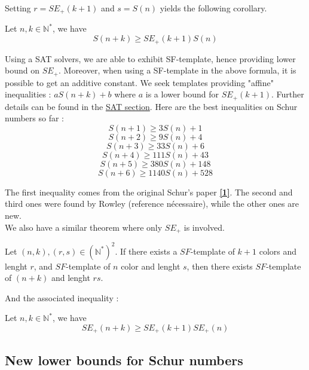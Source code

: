 Setting $r = SE_+(k+1)$ and $s = S(n)$ yields the following corollary. 

\begin{corollary}
	Let \(n, k \in \mathbb{N}^*\), we have \\
	\[ S(n+k) \geqslant SE_+(k+1)S(n) \]
\end{corollary}

Using a SAT solvers, we are able to exhibit SF-template,
hence providing lower bound on \(SE_+\). Moreover, when using 
a SF-template in the above formula, it is possible to get an additive constant. We seek templates providing "affine"
inequalities : \(aS(n+k) + b \) where \(a\) is a lower bound for \(SE_+(k+1)\). Further details can be found in the \hyperref[SAT]{SAT section}.
Here are the best inequalities on Schur numbers so far :
\[ S(n+1) \geqslant 3S(n) + 1 \]
\[ S(n+2) \geqslant 9S(n) + 4 \]
\[ S(n+3) \geqslant 33S(n) + 6 \]
\[ S(n+4) \geqslant 111S(n) + 43 \]
\[ S(n+5) \geqslant 380S(n) + 148 \]
\[ S(n+6) \geqslant 1140S(n) + 528 \]

The first inequality comes from the original Schur's paper \hyperlink{label1}{\textbf{[1]}}. The second and third ones were found by Rowley (reference nécessaire), 
while the other ones are new. \\

We also have a similar theorem where only \(SE_+\) is involved. 

\begin{theorem}
	Let $(n,k), (r,s) \in (\mathbb{N}^*)^2$. If there exists a \(SF\)-template of $k+1$ colors and lenght \(r\),
	and \(SF\)-template of \(n\) color and lenght \(s\), then there exists \(SF\)-template of \((n+k)\) and lenght \(rs\).
\end{theorem}

And the associated inequality :

\begin{corollary}
	Let \(n, k \in \mathbb{N}^*\), we have \\
	\[ SE_+(n+k) \geqslant SE_+(k+1)SE_+(n) \]
\end{corollary}


\subsection{New lower bounds for Schur numbers}


